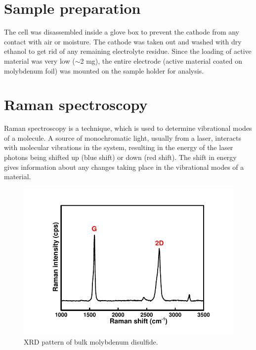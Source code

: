 \section*{Sample preparation}
The cell was disassembled inside a glove box to prevent the cathode from any contact with air or moisture. The cathode was taken out and washed with dry ethanol to get rid of any remaining electrolyte residue. Since the loading of active material was very low ($\sim$2 mg), the entire electrode (active material coated on molybdenum foil) was mounted on the sample holder for analysis. 

\section{Raman spectroscopy}
Raman spectroscopy is a technique, which is used to determine vibrational modes of a molecule. A source of monochromatic light, usually from a laser, interacts with molecular vibrations in the system, resulting in the energy of the laser photons being shifted up (blue shift) or down (red shift). The shift in energy gives information about any changes taking place in the vibrational modes of a material. 
\begin{figure}[tbh!]
\centering
\includegraphics[width=\textwidth]{Figures/chap2fig/Raman}
\caption{XRD pattern of bulk molybdenum disulfide.}
\label{Figures/chap2fig:Raman}
\end{figure}


